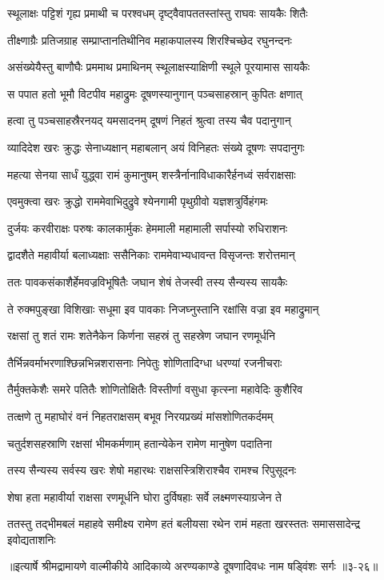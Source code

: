 \twolineshloka
{स्थूलाक्षः पट्टिशं गृह्य प्रमाथी च परश्वधम्}
{दृष्ट्वैवापततस्तांस्तु राघवः सायकैः शितैः} %

\twolineshloka
{तीक्ष्णाग्रैः प्रतिजग्राह सम्प्राप्तानतिथीनिव}
{महाकपालस्य शिरश्चिच्छेद रघुनन्दनः} %

\twolineshloka
{असंख्येयैस्तु बाणौघैः प्रममाथ प्रमाथिनम्}
{स्थूलाक्षस्याक्षिणी स्थूले पूरयामास सायकैः} %

\twolineshloka
{स पपात हतो भूमौ विटपीव महाद्रुमः}
{दूषणस्यानुगान् पञ्चसाहस्रान् कुपितः क्षणात्} %

\twolineshloka
{हत्वा तु पञ्चसाहस्रैरनयद् यमसादनम्}
{दूषणं निहतं श्रुत्वा तस्य चैव पदानुगान्} %

\twolineshloka
{व्यादिदेश खरः क्रुद्धः सेनाध्यक्षान् महाबलान्}
{अयं विनिहतः संख्ये दूषणः सपदानुगः} %

\twolineshloka
{महत्या सेनया सार्धं युद्ध्वा रामं कुमानुषम्}
{शस्त्रैर्नानाविधाकारैर्हनध्वं सर्वराक्षसाः} %

\twolineshloka
{एवमुक्त्वा खरः क्रुद्धो राममेवाभिदुद्रुवे}
{श्येनगामी पृथुग्रीवो यज्ञशत्रुर्विहंगमः} %

\twolineshloka
{दुर्जयः करवीराक्षः परुषः कालकार्मुकः}
{हेममाली महामाली सर्पास्यो रुधिराशनः} %

\twolineshloka
{द्वादशैते महावीर्या बलाध्यक्षाः ससैनिकाः}
{राममेवाभ्यधावन्त विसृजन्तः शरोत्तमान्} %

\twolineshloka
{ततः पावकसंकाशैर्हेमवज्रविभूषितैः}
{जघान शेषं तेजस्वी तस्य सैन्यस्य सायकैः} %

\twolineshloka
{ते रुक्मपुङ्खा विशिखाः सधूमा इव पावकाः}
{निजघ्नुस्तानि रक्षांसि वज्रा इव महाद्रुमान्} %

\twolineshloka
{रक्षसां तु शतं रामः शतेनैकेन किर्णना}
{सहस्रं तु सहस्रेण जघान रणमूर्धनि} %

\twolineshloka
{तैर्भिन्नवर्माभरणाश्छिन्नभिन्नशरासनाः}
{निपेतुः शोणितादिग्धा धरण्यां रजनीचराः} %

\twolineshloka
{तैर्मुक्तकेशैः समरे पतितैः शोणितोक्षितैः}
{विस्तीर्णा वसुधा कृत्स्ना महावेदिः कुशैरिव} %

\twolineshloka
{तत्क्षणे तु महाघोरं वनं निहतराक्षसम्}
{बभूव निरयप्रख्यं मांसशोणितकर्दमम्} %

\twolineshloka
{चतुर्दशसहस्राणि रक्षसां भीमकर्मणाम्}
{हतान्येकेन रामेण मानुषेण पदातिना} %

\twolineshloka
{तस्य सैन्यस्य सर्वस्य खरः शेषो महारथः}
{राक्षसस्त्रिशिराश्चैव रामश्च रिपुसूदनः} %

\twolineshloka
{शेषा हता महावीर्या राक्षसा रणमूर्धनि}
{घोरा दुर्विषहाः सर्वे लक्ष्मणस्याग्रजेन ते} %

\twolineshloka
{ततस्तु तद्भीमबलं महाहवे समीक्ष्य रामेण हतं बलीयसा}
{रथेन रामं महता खरस्ततः समाससादेन्द्र इवोद्यताशनिः} %


॥इत्यार्षे श्रीमद्रामायणे वाल्मीकीये आदिकाव्ये अरण्यकाण्डे दूषणादिवधः नाम षड्विंशः सर्गः ॥३-२६॥
